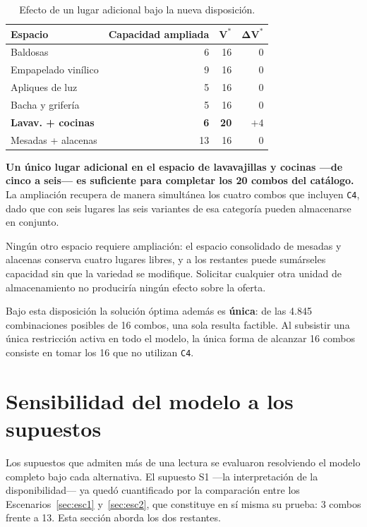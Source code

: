 \documentclass[10pt,a4paper]{article}
\newcommand{\cuello}[1]{\textbf{\textcolor{limita}{#1}}}
\newcommand{\art}[1]{\texttt{#1}}
\begin{document}
\begin{table}[H]
\centering\small
\caption{Efecto de un lugar adicional bajo la nueva disposición.}
\label{tab:cap_e3}
\begin{tabular}{lrrr}
\toprule
\textbf{Espacio} & \textbf{Capacidad ampliada} & $\boldsymbol{V^{*}}$ & $\boldsymbol{\Delta V^{*}}$ \\
\midrule
Baldosas                  & 6  & 16 & 0 \\
Empapelado vinílico       & 9  & 16 & 0 \\
Apliques de luz           & 5  & 16 & 0 \\
Bacha y grifería          & 5  & 16 & 0 \\
\cuello{Lavav. + cocinas} & \cuello{6} & \cuello{20} & \cuello{$+4$} \\
Mesadas + alacenas        & 13 & 16 & 0 \\
\bottomrule
\end{tabular}
\end{table}

\textbf{Un único lugar adicional en el espacio de lavavajillas y cocinas —de
cinco a seis— es suficiente para completar los 20 combos del catálogo.} La
ampliación recupera de manera simultánea los cuatro combos que incluyen
\art{C4}, dado que con seis lugares las seis variantes de esa categoría pueden
almacenarse en conjunto.

Ningún otro espacio requiere ampliación: el espacio consolidado de mesadas y
alacenas conserva cuatro lugares libres, y a los restantes puede sumárseles
capacidad sin que la variedad se modifique. Solicitar cualquier otra unidad de
almacenamiento no produciría ningún efecto sobre la oferta.

Bajo esta disposición la solución óptima además es \textbf{única}: de las 4.845
combinaciones posibles de 16 combos, una sola resulta factible. Al subsistir una
única restricción activa en todo el modelo, la única forma de alcanzar 16 combos
consiste en tomar los 16 que no utilizan \art{C4}.

\section{Sensibilidad del modelo a los supuestos}
\label{sec:sensibilidad}

Los supuestos que admiten más de una lectura se evaluaron resolviendo el modelo
completo bajo cada alternativa. El supuesto S1 —la interpretación de la
disponibilidad— ya quedó cuantificado por la comparación entre los
Escenarios~\ref{sec:esc1} y~\ref{sec:esc2}, que constituye en sí misma su
prueba: 3 combos frente a 13. Esta sección aborda los dos restantes.
\end{document}
